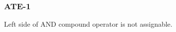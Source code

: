 \subsubsection{ATE-1}\label{sec:error_code_ate_1}

Left side of AND compound operator is not assignable.



